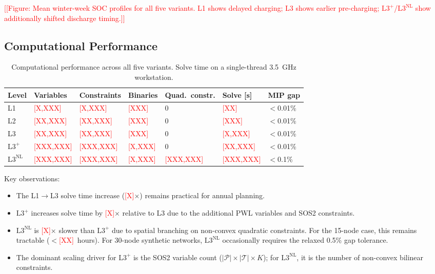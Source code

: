 \documentclass[review,3p]{elsarticle}
\newcommand{\placeholder}[1]{\textcolor{red}{[#1]}}
\newcommand{\Lplus}{\mathrm{L3}^{+}}
\newcommand{\Lnl}{\mathrm{L3}^{\mathrm{NL}}}
\begin{document}
\placeholder{[Figure: Mean winter-week SOC profiles for all five
variants. L1 shows delayed charging; L3 shows earlier pre-charging;
$\Lplus$/$\Lnl$ show additionally shifted discharge timing.]}

\subsection{Computational Performance}
\label{sec:results_computation}

\begin{table}[htbp]
\centering
\caption{Computational performance across all five variants.
Solve time on a single-thread 3.5~GHz workstation.}
\label{tab:losses_computation}
\begin{tabular}{@{}lllllll@{}}
\toprule
Level & Variables & Constraints & Binaries
  & Quad.\ constr. & Solve [s] & MIP gap \\
\midrule
L1 & \placeholder{X,XXX} & \placeholder{X,XXX}
  & \placeholder{XXX} & 0 & \placeholder{XX}
  & $<$0.01\% \\
L2 & \placeholder{XX,XXX} & \placeholder{XX,XXX}
  & \placeholder{XXX} & 0 & \placeholder{XXX}
  & $<$0.01\% \\
L3 & \placeholder{XX,XXX} & \placeholder{XX,XXX}
  & \placeholder{XXX} & 0 & \placeholder{X,XXX}
  & $<$0.01\% \\
$\Lplus$ & \placeholder{XXX,XXX} & \placeholder{XXX,XXX}
  & \placeholder{X,XXX} & 0 & \placeholder{XX,XXX}
  & $<$0.01\% \\
$\Lnl$ & \placeholder{XXX,XXX} & \placeholder{XXX,XXX}
  & \placeholder{X,XXX} & \placeholder{XXX,XXX}
  & \placeholder{XXX,XXX} & $<$0.1\% \\
\bottomrule
\end{tabular}
\end{table}

Key observations:
\begin{itemize}[nosep]
    \item The L1$\to$L3 solve time increase
    (\placeholder{X}$\times$) remains practical for annual
    planning.
    \item $\Lplus$ increases solve time by
    \placeholder{X}$\times$ relative to L3 due to the additional
    PWL variables and SOS2 constraints.
    \item $\Lnl$ is \placeholder{X}$\times$ slower than $\Lplus$
    due to spatial branching on non-convex quadratic constraints.
    For the 15-node case, this remains tractable
    ($<$\placeholder{XX}~hours). For 30-node synthetic networks,
    $\Lnl$ occasionally requires the relaxed 0.5\% gap tolerance.
    \item The dominant scaling driver for $\Lplus$ is the SOS2
    variable count ($|\mathcal{P}| \times |\mathcal{T}| \times K$);
    for $\Lnl$, it is the number of non-convex bilinear constraints.
\end{itemize}
\end{document}
